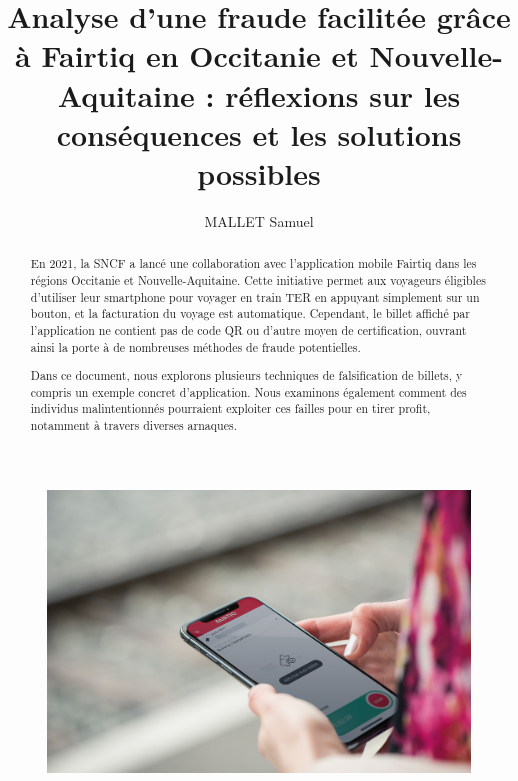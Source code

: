 \documentclass[a4paper]{article}
\date{\displaydate{date}}
\title{Analyse d'une fraude facilitée grâce à Fairtiq en Occitanie et Nouvelle-Aquitaine : réflexions sur les conséquences et les solutions possibles}
\author{MALLET Samuel}
\begin{document}
\maketitle

\pagestyle{fancy}
\fancyhead{}
\fancyhead[L]{\leftmark}


\thispagestyle{empty}

\begin{abstract}
  En 2021, la SNCF a lancé une collaboration avec l'application mobile Fairtiq dans les
  régions Occitanie et Nouvelle-Aquitaine. Cette initiative permet aux voyageurs éligibles
  d'utiliser leur smartphone pour voyager en train TER en appuyant simplement sur un bouton,
  et la facturation du voyage est automatique. Cependant, le billet affiché par l'application
  ne contient pas de code QR ou d'autre moyen de certification, ouvrant ainsi la porte à de
  nombreuses méthodes de fraude potentielles.

  Dans ce document, nous explorons plusieurs techniques de falsification de billets,
  y compris un exemple concret d'application. Nous examinons également comment
  des individus malintentionnés pourraient exploiter ces failles pour en tirer profit,
  notamment à travers diverses arnaques.


\end{abstract}


\begin{figure}[h]
  \includegraphics[width=\textwidth]{illustrations/images/fairtiq_close_up_FR.jpg}
\end{figure}

\clearpage
\end{document}
